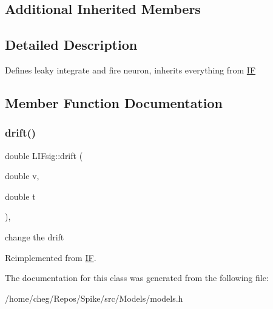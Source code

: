 \subsection*{Additional Inherited Members}


\subsection{Detailed Description}
Defines leaky integrate and fire neuron, inherits everything from \mbox{\hyperlink{classIF}{IF}} 

\subsection{Member Function Documentation}
\mbox{\label{classLIFsig_a169dcb5d3704157102bbc725445cf0a5}} 
\subsubsection{\texorpdfstring{drift()}{drift()}}
{\footnotesize\ttfamily double L\+I\+Fsig\+::drift (\begin{DoxyParamCaption}\item[{double}]{v,  }\item[{double}]{t }\end{DoxyParamCaption})\hspace{0.3cm}{\ttfamily [inline]}, {\ttfamily [virtual]}}

change the drift 

Reimplemented from \mbox{\hyperlink{classIF_a9bbd53df68cb9028bf87cf5273253e91}{IF}}.



The documentation for this class was generated from the following file\+:\begin{DoxyCompactItemize}
\item 
/home/cheg/\+Repos/\+Spike/src/\+Models/models.\+h\end{DoxyCompactItemize}
